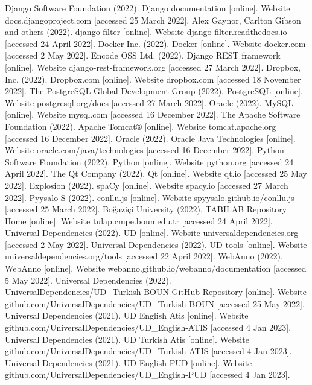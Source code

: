 \begin{thebibliography}{99}
 Django Software Foundation (2022). Django documentation [online]. Website docs.djangoproject.com [accessed 25 March 2022].
 Alex Gaynor, Carlton Gibson and others (2022). django-filter [online]. Website django-filter.readthedocs.io [accessed 24 April 2022].
 Docker Inc. (2022). Docker [online]. Website docker.com [accessed 2 May 2022].
 Encode OSS Ltd. (2022). Django REST framework [online]. Website django-rest-framework.org [accessed 27 March 2022].
 Dropbox, Inc. (2022). Dropbox.com [online]. Website dropbox.com [accessed 18 November 2022].
 The PostgreSQL Global Development Group (2022). PostgreSQL [online]. Website postgresql.org/docs [accessed 27 March 2022].
 Oracle (2022). MySQL [online]. Website mysql.com [accessed 16 December 2022].
 The Apache Software Foundation (2022). Apache Tomcat® [online]. Website tomcat.apache.org [accessed 16 December 2022].
 Oracle (2022). Oracle Java Technologies [online]. Website oracle.com/java/technologies [accessed 16 December 2022].
 Python Software Foundation (2022). Python [online]. Website python.org [accessed 24 April 2022].
 The Qt Company (2022). Qt [online]. Website qt.io [accessed 25 May 2022].
 Explosion (2022). spaCy [online]. Website spacy.io [accessed 27 March 2022].
 Pyysalo S (2022). conllu.js [online]. Website spyysalo.github.io/conllu.js [accessed 25 March 2022].
 Boğaziçi University (2022). TABILAB Repository Home [online]. Website tulap.cmpe.boun.edu.tr [accessed 24 April 2022].
 Universal Dependencies (2022). UD [online]. Website universaldependencies.org [accessed 2 May 2022].
 Universal Dependencies (2022). UD tools [online]. Website universaldependencies.org/tools [accessed 22 April 2022].
 WebAnno (2022). WebAnno [online]. Website webanno.github.io/webanno/documentation [accessed 5 May 2022].
 Universal Dependencies (2022). UniversalDependencies/UD\_Turkish-BOUN GitHub Repository [online]. Website github.com/UniversalDependencies/UD\_Turkish-BOUN [accessed 25 May 2022].
 Universal Dependencies (2021). UD English Atis [online]. Website github.com/UniversalDependencies/UD\_English-ATIS [accessed 4 Jan 2023].
 Universal Dependencies (2021). UD Turkish Atis [online]. Website github.com/UniversalDependencies/UD\_Turkish-ATIS [accessed 4 Jan 2023].
 Universal Dependencies (2021). UD English PUD [online]. Website github.com/UniversalDependencies/UD\_English-PUD [accessed 4 Jan 2023].

\end{thebibliography}
